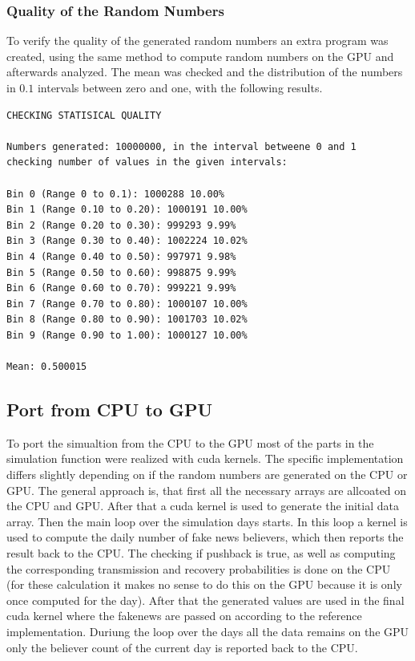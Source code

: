 \documentclass[12pt,a4paper]{article}
\begin{document}
\subsubsection*{Quality of the Random Numbers}
To verify the quality of the generated random numbers an extra program was created, using the same method to compute random numbers on the GPU and afterwards analyzed. The mean was checked and the distribution of the numbers in $0.1$ intervals between zero and one, with the following results.
\begin{lstlisting}
CHECKING STATISICAL QUALITY

Numbers generated: 10000000, in the interval betweene 0 and 1
checking number of values in the given intervals:

Bin 0 (Range 0 to 0.1): 1000288 10.00%
Bin 1 (Range 0.10 to 0.20): 1000191 10.00%
Bin 2 (Range 0.20 to 0.30): 999293 9.99%
Bin 3 (Range 0.30 to 0.40): 1002224 10.02%
Bin 4 (Range 0.40 to 0.50): 997971 9.98%
Bin 5 (Range 0.50 to 0.60): 998875 9.99%
Bin 6 (Range 0.60 to 0.70): 999221 9.99%
Bin 7 (Range 0.70 to 0.80): 1000107 10.00%
Bin 8 (Range 0.80 to 0.90): 1001703 10.02%
Bin 9 (Range 0.90 to 1.00): 1000127 10.00%

Mean: 0.500015
\end{lstlisting}

\subsection*{Port from CPU to GPU}
To port the simualtion from the CPU to the GPU most of the parts in the simulation function were realized with cuda kernels. The specific implementation differs slightly depending on if the random numbers are generated on the CPU or GPU. The general approach is, that first all the necessary arrays are allcoated on the CPU and GPU. After that a cuda kernel is used to generate the initial data array. Then the main loop over the simulation days starts. In this loop a kernel is used to compute the daily number of fake news believers, which then reports the result back to the CPU. The checking if pushback is true, as well as computing the corresponding transmission and recovery probabilities is done on the CPU (for these calculation it makes no sense to do this on the GPU because it is only once computed for the day). After that the generated values are used in the final cuda kernel where the fakenews are passed on according to the reference  implementation. Duriung the loop over the days all the data remains on the GPU only the believer count of the current day is reported back to the CPU.
\end{document}
